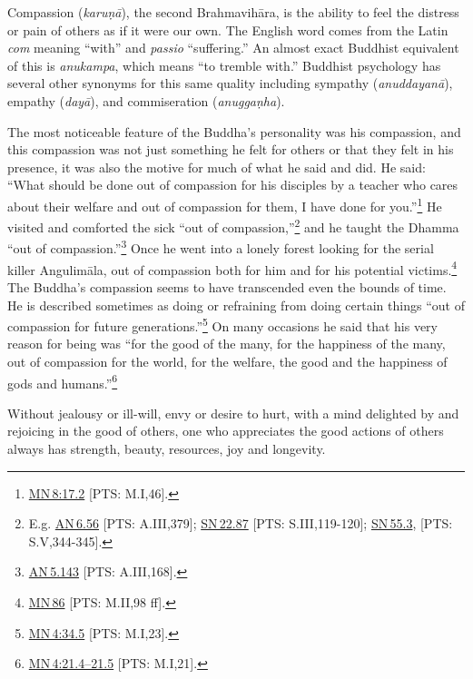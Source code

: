 \documentclass[10pt, openright]{book}
\newenvironment{epigram-2}%
{%
\vspace{1em}
\noindent
\quoting[leftmargin=2.5cm,rightmargin=2.5cm]%
\begin{itshape}
\large
}%
{\end{itshape}\endquoting
}%
\begin{document}
Compassion (\textit{karuṇā}), the second Brahmavihāra, is the ability to feel the distress or pain of others as if it were our own. The English word comes from the Latin \textit{com} meaning “with” and \textit{passio} “suffering.” An almost exact Buddhist equivalent of this is \textit{anukampa}, which means “to tremble with.” Buddhist psychology has several other synonyms for this same quality including sympathy (\textit{anuddayanā}), empathy (\textit{dayā}), and commiseration (\textit{anuggaṇha}).


The most noticeable feature of the Buddha’s personality was his compassion, and this compassion was not just something he felt for others or that they felt in his presence, it was also the motive for much of what he said and did. He said: “What should be done out of compassion for his disciples by a teacher who cares about their welfare and out of compassion for them, I have done for you.”\footnote {\href{https://suttacentral.net/mn8/en/sujato\#17.2}{MN 8:17.2} [PTS: M.I,46].} He visited and comforted the sick “out of compassion,”\footnote {E.g. \href{https://suttacentral.net/an6.56/en/sujato}{AN 6.56} [PTS: A.III,379]; \href{https://suttacentral.net/sn22.87/en/sujato}{SN 22.87} [PTS: S.III,119-120]; \href{https://suttacentral.net/sn55.3/en/sujato}{SN 55.3}, [PTS: S.V,344-345].} and he taught the Dhamma “out of compassion.”\footnote {\href{https://suttacentral.net/an5.143/en/sujato}{AN 5.143} [PTS: A.III,168].} Once he went into a lonely forest looking for the serial killer Angulimāla, out of compassion both for him and for his potential victims.\footnote {\href{https://suttacentral.net/mn86/en/sujato}{MN 86} [PTS: M.II,98 ff].} The Buddha’s compassion seems to have transcended even the bounds of time. He is described sometimes as doing or refraining from doing certain things “out of compassion for future generations.”\footnote {\href{https://suttacentral.net/mn4/en/sujato\#34.5}{MN 4:34.5} [PTS: M.I,23].} On many occasions he said that his very reason for being was “for the good of the many, for the happiness of the many, out of compassion for the world, for the welfare, the good and the happiness of gods and humans.”\footnote {\href{https://suttacentral.net/mn4/en/sujato\#21.4}{MN 4:21.4–21.5} [PTS: M.I,21].}


\begin{epigram-2}
Without jealousy or ill-will, envy or desire to hurt, with a mind delighted by and rejoicing in the good of others, one who appreciates the good actions of others always has strength, beauty, resources, joy and longevity.
\end{epigram-2}
\end{document}
